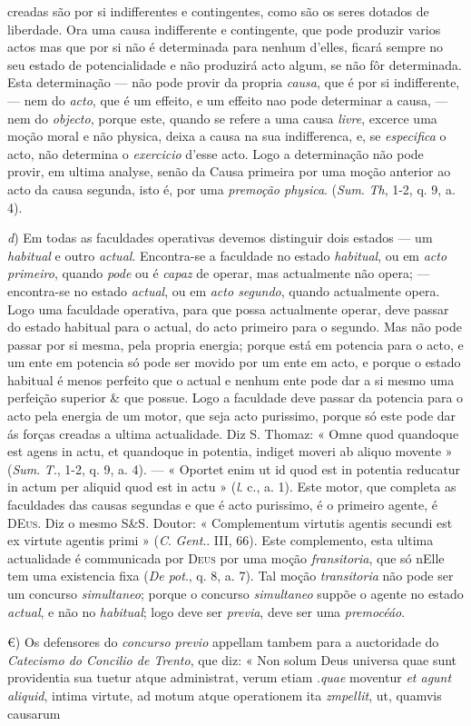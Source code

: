creadas são por si indifferentes e contingentes, como são os seres dotados de liberdade. Ora uma causa indifferente e contingente, que pode produzir varios actos mas que por si não é determinada para nenhum d'elles, ficará sempre no seu estado de potencialidade e não produzirá acto algum, se não fôr determinada. Esta determinação --- não pode provir da propria \emph{causa}, que é por si indifferente, --- nem do \emph{acto}, que é um effeito, e um effeito nao pode determinar a causa, --- nem do \emph{objecto}, porque este, quando se refere a uma causa \emph{livre}, excerce uma moção moral e não physica, deixa a causa na sua indifferenca, e, se \emph{especifica} o acto, não determina o \emph{exercicio} d'esse acto. Logo a determinação não pode provir, em ultima analyse, senão da Causa primeira por uma moção anterior ao acto da causa segunda, isto é, por uma \emph{premoção physica}. (\emph{Sum}. \emph{Th}, 1-2, q. 9, a. 4).\par \emph{d}) Em todas as faculdades operativas devemos distinguir dois estados --- um \emph{habitual} e outro \emph{actual}. Encontra-se a faculdade no estado \emph{habitual}, ou em \emph{acto primeiro}, quando \emph{pode} ou é \emph{capaz} de operar, mas actualmente não opera; --- encontra-se no estado \emph{actual}, ou em \emph{acto segundo}, quando actualmente opera. Logo uma faculdade operativa, para que possa actualmente operar, deve passar do estado habitual para o actual, do acto primeiro para o segundo. Mas não pode passar por si mesma, pela propria energia; porque está em potencia para o acto, e um ente em potencia só pode ser movido por um ente em acto, e porque o estado habitual é menos perfeito que o actual e nenhum ente pode dar a si mesmo uma perfeição superior \& que possue. Logo a faculdade deve passar da potencia para o acto pela energia de um motor, que seja acto purissimo, porque só este pode dar ás forças creadas a ultima actualidade. Diz S. Thomaz: « Omne quod quandoque est agens in actu, et quandoque in potentia, indiget moveri ab aliquo movente » (\emph{Sum}. \emph{T}., 1-2, q. 9, a. 4). --- « Oportet enim ut id quod est in potentia reducatur in actum per aliquid quod est in actu » (\emph{l}. c., a. 1). Este motor, que completa as faculdades das causas segundas e que é acto purissimo, é o primeiro agente, é \textsc{DEus}. Diz o mesmo S\&S. Doutor: « Complementum virtutis agentis secundi est ex virtute agentis primi » (\emph{C}. \emph{Gent}.. III, 66). Este complemento, esta ultima actualidade é communicada por \textsc{Deus} por uma moção \emph{fransitoria}, que só nElle tem uma existencia fixa (\emph{De pot}., q. 8, a. 7). Tal moção \emph{transitoria} não pode ser um concurso \emph{simultaneo}; porque o concurso \emph{simultaneo} suppõe o agente no estado \emph{actual}, e não no \emph{habitual}; logo deve ser \emph{previa}, deve ser uma \emph{premocéáo}.\par €) Os defensores do \emph{concurso previo} appellam tambem para a auctoridade do \emph{Catecismo do Concilio de Trento}, que diz: « Non solum Deus universa quae sunt providentia sua tuetur atque administrat, verum etiam .\emph{quae} moventur \emph{et agunt aliquid}, intima virtute, ad motum atque operationem ita \emph{zmpellit}, ut, quamvis causarum 